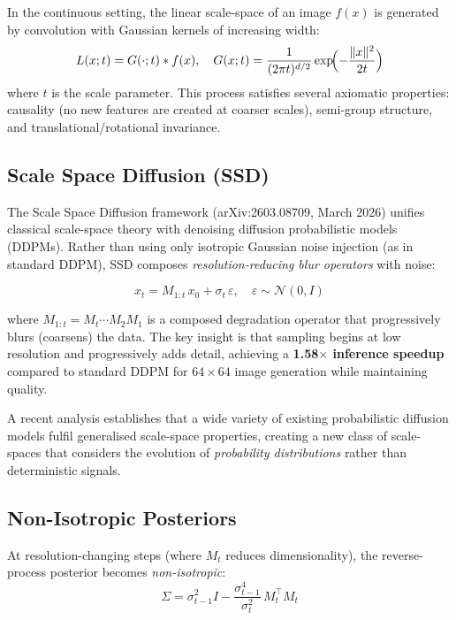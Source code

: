 \documentclass[11pt,a4paper]{article}
\begin{document}
In the continuous setting, the linear scale-space of an image $f(x)$ is
generated by convolution with Gaussian kernels of increasing width:
\begin{equation}
  L(x; t) = G(\cdot; t) * f(x), \quad
  G(x; t) = \frac{1}{(2\pi t)^{d/2}} \exp\!\Bigl(-\frac{\|x\|^2}{2t}\Bigr)
\end{equation}
where $t$ is the scale parameter. This process satisfies several axiomatic
properties: causality (no new features are created at coarser scales),
semi-group structure, and translational/rotational invariance.

\subsection{Scale Space Diffusion (SSD)}

The Scale Space Diffusion framework (arXiv:2603.08709, March 2026) unifies
classical scale-space theory with denoising diffusion probabilistic models
(DDPMs). Rather than using only isotropic Gaussian noise injection (as in
standard DDPM), SSD composes \emph{resolution-reducing blur operators} with
noise:

\begin{equation}
  x_t = M_{1:t}\, x_0 + \sigma_t\, \varepsilon, \quad
  \varepsilon \sim \mathcal{N}(0, I)
\end{equation}

where $M_{1:t} = M_t \cdots M_2 M_1$ is a composed degradation operator that
progressively blurs (coarsens) the data. The key insight is that sampling
begins at low resolution and progressively adds detail, achieving a
\textbf{1.58$\times$ inference speedup} compared to standard DDPM for
$64 \times 64$ image generation while maintaining quality.

A recent analysis establishes that a wide variety of existing probabilistic
diffusion models fulfil generalised scale-space properties, creating a new
class of scale-spaces that considers the evolution of \emph{probability
distributions} rather than deterministic signals.

\subsection{Non-Isotropic Posteriors}

At resolution-changing steps (where $M_t$ reduces dimensionality), the
reverse-process posterior becomes \emph{non-isotropic}:
\begin{equation}
  \Sigma = \sigma_{t-1}^2 I - \frac{\sigma_{t-1}^4}{\sigma_t^2}\, M_t^\top M_t
\end{equation}
\end{document}
